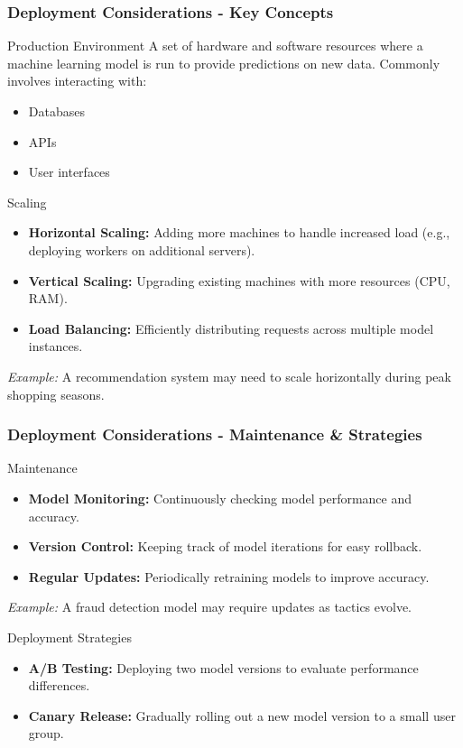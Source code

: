 \documentclass[aspectratio=169]{beamer}
\begin{document}
\begin{frame}[fragile]
    \frametitle{Deployment Considerations - Key Concepts}
    \begin{block}{Production Environment}
        A set of hardware and software resources where a machine learning model is run to provide predictions on new data.
        Commonly involves interacting with:
        \begin{itemize}
            \item Databases
            \item APIs
            \item User interfaces
        \end{itemize}
    \end{block}

    \begin{block}{Scaling}
        \begin{itemize}
            \item \textbf{Horizontal Scaling:} Adding more machines to handle increased load (e.g., deploying workers on additional servers).
            \item \textbf{Vertical Scaling:} Upgrading existing machines with more resources (CPU, RAM).
            \item \textbf{Load Balancing:} Efficiently distributing requests across multiple model instances.
        \end{itemize}
        \textit{Example:} A recommendation system may need to scale horizontally during peak shopping seasons.
    \end{block}
\end{frame}

\begin{frame}[fragile]
    \frametitle{Deployment Considerations - Maintenance & Strategies}
    \begin{block}{Maintenance}
        \begin{itemize}
            \item \textbf{Model Monitoring:} Continuously checking model performance and accuracy.
            \item \textbf{Version Control:} Keeping track of model iterations for easy rollback.
            \item \textbf{Regular Updates:} Periodically retraining models to improve accuracy.
        \end{itemize}
        \textit{Example:} A fraud detection model may require updates as tactics evolve.
    \end{block}

    \begin{block}{Deployment Strategies}
        \begin{itemize}
            \item \textbf{A/B Testing:} Deploying two model versions to evaluate performance differences.
            \item \textbf{Canary Release:} Gradually rolling out a new model version to a small user group.
        \end{itemize}
    \end{block}
\end{frame}
\end{document}
